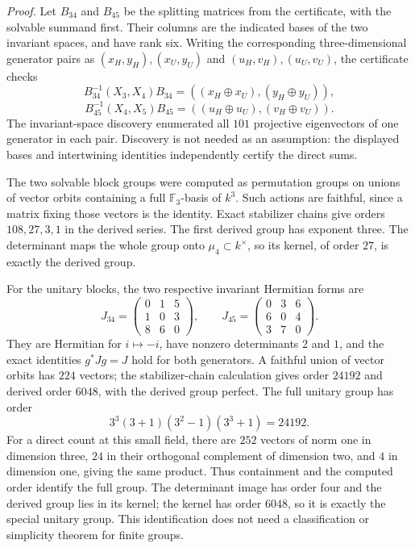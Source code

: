 \emph{Proof.}
Let $B_{34}$ and $B_{45}$ be the splitting matrices from the
certificate, with the solvable summand first.  Their columns are
the indicated bases of the two invariant spaces, and have rank six.
Writing the corresponding three-dimensional generator pairs as
$(x_H,y_H),(x_U,y_U)$ and $(u_H,v_H),(u_U,v_U)$, the certificate
checks
\[
 B_{34}^{-1}(X_3,X_4)B_{34}
    =((x_H\oplus x_U),(y_H\oplus y_U)),
\]
\[
 B_{45}^{-1}(X_4,X_5)B_{45}
    =((u_H\oplus u_U),(v_H\oplus v_U)).
\]
The invariant-space discovery enumerated all $101$ projective
eigenvectors of one generator in each pair.  Discovery is not
needed as an assumption: the displayed bases and intertwining
identities independently certify the direct sums.

The two solvable block groups were computed as permutation groups
on unions of vector orbits containing a full $\mathbb F_3$-basis
of $k^3$.  Such actions are faithful, since a matrix fixing those
vectors is the identity.  Exact stabilizer chains give orders
$108,27,3,1$ in the derived series.  The first derived group has
exponent three.  The determinant maps the whole group onto
$\mu_4\subset k^\times$, so its kernel, of order $27$, is exactly
the derived group.

For the unitary blocks, the two respective invariant Hermitian
forms are
\[
 J_{34}=\begin{pmatrix}0&1&5\\1&0&3\\8&6&0\end{pmatrix},
 \qquad
 J_{45}=\begin{pmatrix}0&3&6\\6&0&4\\3&7&0\end{pmatrix}.
\]
They are Hermitian for $i\mapsto-i$, have nonzero determinants
$2$ and $1$, and the exact identities $g^*Jg=J$ hold for both
generators.  A faithful union of vector orbits has $224$ vectors;
the stabilizer-chain calculation gives order $24192$ and derived
order $6048$, with the derived group perfect.  The full unitary
group has order
\[
 3^3(3+1)(3^2-1)(3^3+1)=24192.
\]
For a direct count at this small field, there are $252$ vectors of
norm one in dimension three, $24$ in their orthogonal complement
of dimension two, and $4$ in dimension one, giving the same product.
Thus containment and the computed order identify the full group.
The determinant image has order four and the derived group lies
in its kernel; the kernel has order $6048$, so it is exactly the
special unitary group.  This identification does not need a
classification or simplicity theorem for finite groups.

